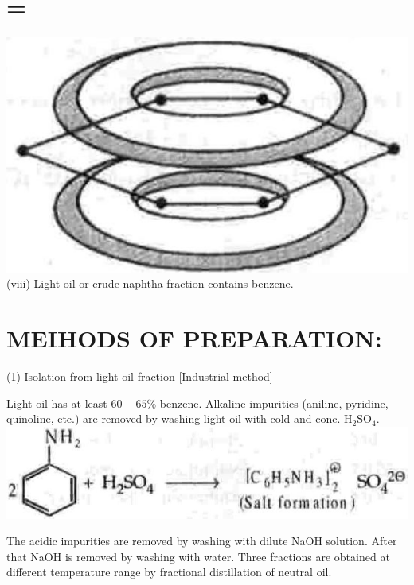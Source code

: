 \documentclass[10pt]{article}
\begin{document}
\section*{=}
\includegraphics[max width=\textwidth, center]{2025_01_28_8470952b98110cec3aabg-204(3)}\\
(viii) Light oil or crude naphtha fraction contains benzene.

\section*{MEIHODS OF PREPARATION:}
(1) Isolation from light oil fraction [Industrial method]

Light oil has at least $60-65 \%$ benzene. Alkaline impurities (aniline, pyridine, quinoline, etc.) are removed by washing light oil with cold and conc. $\mathrm{H}_{2} \mathrm{SO}_{4}$.\\
\includegraphics[max width=\textwidth, center]{2025_01_28_8470952b98110cec3aabg-204(5)}

The acidic impurities are removed by washing with dilute NaOH solution. After that NaOH is removed by washing with water. Three fractions are obtained at different temperature range by fractional distillation of neutral oil.
\end{document}
